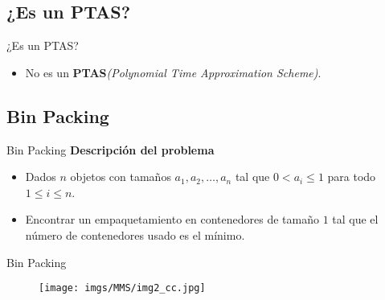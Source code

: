 \renewcommand{\subsectiontitle}{¿Es un PTAS?}
\subsection{\subsectiontitle}

\begin{frame}{\subsectiontitle}
    \begin{itemize}
        \item No es un \textbf{PTAS}\textit{(Polynomial Time Approximation Scheme)}.
    \end{itemize}
\end{frame}



\renewcommand{\subsectiontitle}{Bin Packing}
\subsection{\subsectiontitle}

\begin{frame}{\subsectiontitle}
    \textbf{Descripción del problema}
    \begin{itemize}
        \item Dados \(n\) objetos con tamaños \(a_{1}, a_{2}, \dotsc, a_{n}\) tal que \(0 < a_{i} \leq 1\) para todo \(1 \leq i \leq n\).
        \item Encontrar un empaquetamiento en contenedores de tamaño \(1\) tal que el número de contenedores usado es el mínimo.
    \end{itemize}
\end{frame}

\begin{frame}{\subsectiontitle}
    \begin{figure}[H]
        \centering
        \texttt{[image: imgs/MMS/img2\_cc.jpg]}
    \end{figure}
\end{frame}

